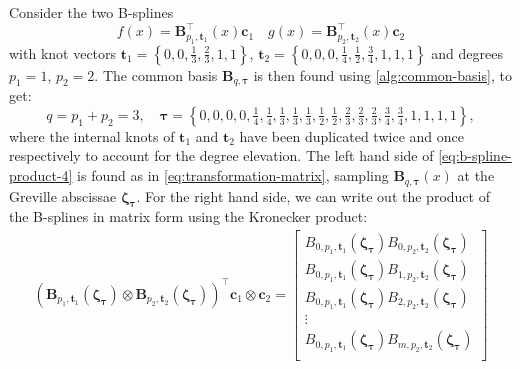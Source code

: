 \begin{indentedexample}
    \label{ex:linear-spline-multiplication}
    Consider the two B-splines
    \begin{equation}
        f(x) = \mathbf{B}_{p_1, \mathbf t_1}^\top(x) \mathbf{c}_1
        \quad g(x) = \mathbf{B}_{p_2, \mathbf t_2}^\top(x) \mathbf{c}_2
    \end{equation}
    with knot vectors $\mathbf t_1 = \left\{0, 0, \frac{1}{3}, \frac{2}{3}, 1, 1\right\}$,  $\mathbf t_2 = \left\{0, 0, 0, \frac{1}{4}, \frac{1}{2}, \frac{3}{4}, 1, 1, 1\right\}$ and degrees  $p_1 = 1$, $p_2 = 2$. 
    The common basis $\mathbf{B}_{q,\boldsymbol{\tau}}$ is then found using \cref{alg:common-basis}, to get:
    \begin{equation}
        q = p_1 + p_2 = 3,
        \quad
        \boldsymbol{\tau} = \left\{0, 0, 0, 0, \tfrac{1}{4}, \tfrac{1}{4}, \tfrac{1}{3}, \tfrac{1}{3}, \tfrac{1}{3}, \tfrac{1}{2}, \tfrac{1}{2}, \tfrac{2}{3}, \tfrac{2}{3}, \tfrac{2}{3}, \tfrac{3}{4}, \tfrac{3}{4}, 1, 1, 1, 1\right\},
    \end{equation}
    where the internal knots of $\mathbf t_1$ and $\mathbf t_2$ have been duplicated twice and once respectively to account for the degree elevation. 
    The left hand side of \cref{eq:b-spline-product-4} is found as in \cref{eq:transformation-matrix}, sampling $\mathbf B_{q, \boldsymbol{\tau}}(x)$ at the Greville abscissae $\boldsymbol{\zeta_\tau}$.
    For the right hand side, we can write out the product of the B-splines in matrix form using the Kronecker product:
    \begin{equation}
        \begin{aligned}
            (\mathbf B_{p_1, \mathbf{t}_1}(\boldsymbol{\zeta_\tau}) \otimes \mathbf B_{p_2, \mathbf{t}_2}(\boldsymbol{\zeta_\tau}))^\top \mathbf{c}_1 \otimes \mathbf{c}_2 = \begin{bmatrix}
                B_{0, p_1, \mathbf{t}_1}(\boldsymbol{\zeta_\tau}) B_{0, p_2, \mathbf{t}_2}(\boldsymbol{\zeta_\tau}) \\
                B_{0, p_1, \mathbf{t}_1}(\boldsymbol{\zeta_\tau}) B_{1, p_2, \mathbf{t}_2}(\boldsymbol{\zeta_\tau}) \\
                B_{0, p_1, \mathbf{t}_1}(\boldsymbol{\zeta_\tau}) B_{2, p_2, \mathbf{t}_2}(\boldsymbol{\zeta_\tau}) \\
                \vdots \\
                B_{0, p_1, \mathbf{t}_1}(\boldsymbol{\zeta_\tau}) B_{m, p_2, \mathbf{t}_2}(\boldsymbol{\zeta_\tau}) \\

\end{bmatrix}
\end{aligned}
\end{equation}
\end{indentedexample}
